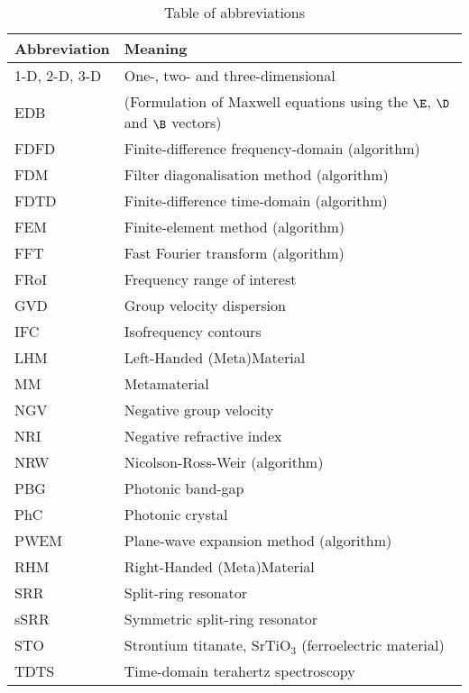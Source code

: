 \begin{table}[ht]   \caption{Table of abbreviations}  \label{tb_shortcuts} \centering 
\begin{tabular}{ll}
 \toprule
Abbreviation & Meaning	\\
 \hline
1-D, 2-D, 3-D & One-, two- and three-dimensional \\
EDB			& (Formulation of Maxwell equations using the $\E$, $\D$ and $\B$ vectors)\\
FDFD 		& Finite-difference frequency-domain (algorithm)\\
FDM 		& Filter diagonalisation method (algorithm)\\
FDTD 		& Finite-difference time-domain (algorithm)\\
FEM 		& Finite-element method (algorithm)\\
FFT 		& Fast Fourier transform (algorithm)\\
FRoI 		& Frequency range of interest\\
GVD 		& Group velocity dispersion \\
IFC			& Isofrequency contours\\
LHM			& Left-Handed (Meta)Material\\ 
MM			& Metamaterial\\
NGV 		& Negative group velocity\\
NRI 		& Negative refractive index\\
NRW 		& Nicolson-Ross-Weir (algorithm)\\
PBG			& Photonic band-gap\\
PhC 		& Photonic crystal\\
PWEM 		& Plane-wave expansion method (algorithm)\\
RHM 		& Right-Handed (Meta)Material\\ 
SRR			& Split-ring resonator\\		
sSRR		& Symmetric split-ring resonator\\
STO			& Strontium titanate, SrTiO$_3$ (ferroelectric material)\\
TDTS 		& Time-domain terahertz spectroscopy\\
 \bottomrule
 \end{tabular} \end{table}

